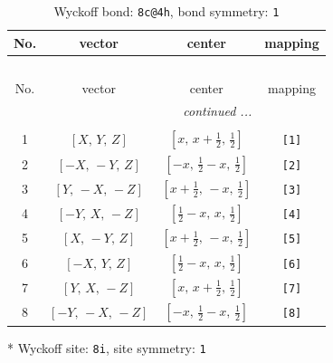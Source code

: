 \documentclass[fleqn,8pt]{jsarticle}
\begin{document}
\renewcommand{\arraystretch}{1.2}
\begin{longtable}{cccc}
\caption{Wyckoff bond: {\tt 8c@4h}, bond symmetry: {\tt 1}}
 \\
 \hline \hline
No. & vector & center & mapping \\ \hline \endfirsthead

\multicolumn{3}{l}{\tablename\ \thetable{}} \\
 \hline \hline
No. & vector & center & mapping \\ \hline \endhead

 \hline \hline
\multicolumn{3}{r}{\footnotesize\it continued ...} \\ \endfoot

 \hline \hline
\multicolumn{3}{r}{} \\ \endlastfoot

1 & $\left[ X,\, Y,\, Z \right]$ & $\left[ x,\, x + \frac{1}{2},\, \frac{1}{2} \right]$ & {\tt [1]} \\ \hline
2 & $\left[ - X,\, - Y,\, Z \right]$ & $\left[ - x,\, \frac{1}{2} - x,\, \frac{1}{2} \right]$ & {\tt [2]} \\ \hline
3 & $\left[ Y,\, - X,\, - Z \right]$ & $\left[ x + \frac{1}{2},\, - x,\, \frac{1}{2} \right]$ & {\tt [3]} \\ \hline
4 & $\left[ - Y,\, X,\, - Z \right]$ & $\left[ \frac{1}{2} - x,\, x,\, \frac{1}{2} \right]$ & {\tt [4]} \\ \hline
5 & $\left[ X,\, - Y,\, Z \right]$ & $\left[ x + \frac{1}{2},\, - x,\, \frac{1}{2} \right]$ & {\tt [5]} \\ \hline
6 & $\left[ - X,\, Y,\, Z \right]$ & $\left[ \frac{1}{2} - x,\, x,\, \frac{1}{2} \right]$ & {\tt [6]} \\ \hline
7 & $\left[ Y,\, X,\, - Z \right]$ & $\left[ x,\, x + \frac{1}{2},\, \frac{1}{2} \right]$ & {\tt [7]} \\ \hline
8 & $\left[ - Y,\, - X,\, - Z \right]$ & $\left[ - x,\, \frac{1}{2} - x,\, \frac{1}{2} \right]$ & {\tt [8]} \\
\end{longtable}
* Wyckoff site: {\tt 8i}, site symmetry: {\tt 1}
\renewcommand{\arraystretch}{1.2}
\end{document}
